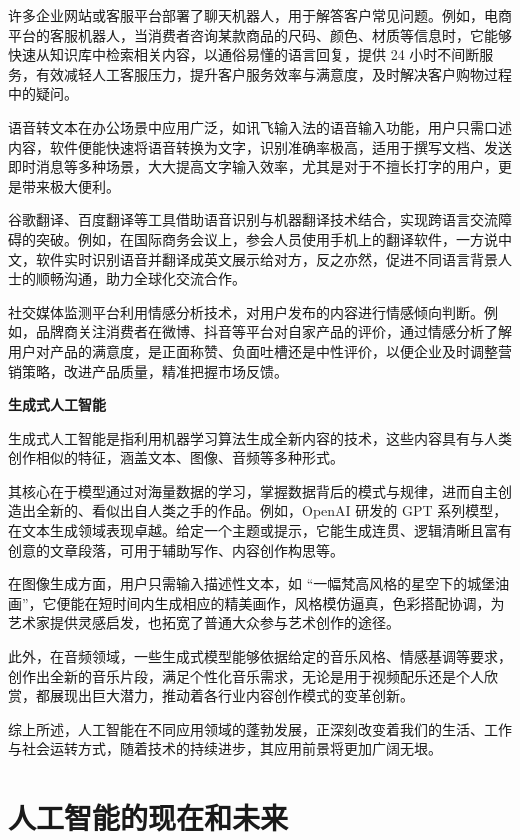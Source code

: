 许多企业网站或客服平台部署了聊天机器人，用于解答客户常见问题。例如，电商平台的客服机器人，当消费者咨询某款商品的尺码、颜色、材质等信息时，它能够快速从知识库中检索相关内容，以通俗易懂的语言回复，提供 24 小时不间断服务，有效减轻人工客服压力，提升客户服务效率与满意度，及时解决客户购物过程中的疑问。


语音转文本在办公场景中应用广泛，如讯飞输入法的语音输入功能，用户只需口述内容，软件便能快速将语音转换为文字，识别准确率极高，适用于撰写文档、发送即时消息等多种场景，大大提高文字输入效率，尤其是对于不擅长打字的用户，更是带来极大便利。


谷歌翻译、百度翻译等工具借助语音识别与机器翻译技术结合，实现跨语言交流障碍的突破。例如，在国际商务会议上，参会人员使用手机上的翻译软件，一方说中文，软件实时识别语音并翻译成英文展示给对方，反之亦然，促进不同语言背景人士的顺畅沟通，助力全球化交流合作。


社交媒体监测平台利用情感分析技术，对用户发布的内容进行情感倾向判断。例如，品牌商关注消费者在微博、抖音等平台对自家产品的评价，通过情感分析了解用户对产品的满意度，是正面称赞、负面吐槽还是中性评价，以便企业及时调整营销策略，改进产品质量，精准把握市场反馈。


\textbf{生成式人工智能}


生成式人工智能是指利用机器学习算法生成全新内容的技术，这些内容具有与人类创作相似的特征，涵盖文本、图像、音频等多种形式。


其核心在于模型通过对海量数据的学习，掌握数据背后的模式与规律，进而自主创造出全新的、看似出自人类之手的作品。例如，OpenAI 研发的 GPT 系列模型，在文本生成领域表现卓越。给定一个主题或提示，它能生成连贯、逻辑清晰且富有创意的文章段落，可用于辅助写作、内容创作构思等。


在图像生成方面，用户只需输入描述性文本，如 “一幅梵高风格的星空下的城堡油画”，它便能在短时间内生成相应的精美画作，风格模仿逼真，色彩搭配协调，为艺术家提供灵感启发，也拓宽了普通大众参与艺术创作的途径。


此外，在音频领域，一些生成式模型能够依据给定的音乐风格、情感基调等要求，创作出全新的音乐片段，满足个性化音乐需求，无论是用于视频配乐还是个人欣赏，都展现出巨大潜力，推动着各行业内容创作模式的变革创新。


综上所述，人工智能在不同应用领域的蓬勃发展，正深刻改变着我们的生活、工作与社会运转方式，随着技术的持续进步，其应用前景将更加广阔无垠。



\section{人工智能的现在和未来}


